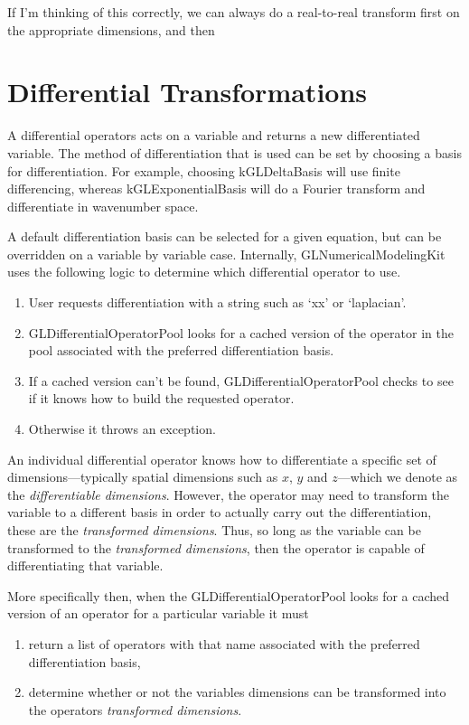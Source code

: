 \documentclass[11pt]{article}
\begin{document}
If I'm thinking of this correctly, we can always do a real-to-real transform first on the appropriate dimensions, and then 



%
%
\section{Differential Transformations}
%
%

A differential operators acts on a variable and returns a new differentiated variable. The method of differentiation that is used can be set by choosing a basis for differentiation. For example, choosing kGLDeltaBasis will use finite differencing, whereas kGLExponentialBasis will do a Fourier transform and differentiate in wavenumber space.

A default differentiation basis can be selected for a given equation, but can be overridden on a variable by variable case. Internally, GLNumericalModelingKit uses the following logic to determine which differential operator to use.

\begin{enumerate}
\item User requests differentiation with a string such as `xx' or `laplacian'.
\item GLDifferentialOperatorPool looks for a cached version of the operator in the pool associated with the preferred differentiation basis.
\item If a cached version can't be found, GLDifferentialOperatorPool checks to see if it knows how to build the requested operator.
\item Otherwise it throws an exception.
\end{enumerate}

An individual differential operator knows how to differentiate a specific set of dimensions---typically spatial dimensions such as $x$, $y$ and $z$---which we denote as the \emph{differentiable dimensions}. However, the operator may need to transform the variable to a different basis in order to actually carry out the differentiation, these are the \emph{transformed dimensions}. Thus, so long as the variable can be transformed to the \emph{transformed dimensions}, then the operator is capable of differentiating that variable.

More specifically then, when the GLDifferentialOperatorPool looks for a cached version of an operator for a particular variable it must
\begin{enumerate}
\item return a list of operators with that name associated with the preferred differentiation basis,
\item determine whether or not the variables dimensions can be transformed into the operators \emph{transformed dimensions}.
\end{enumerate}
\end{document}
